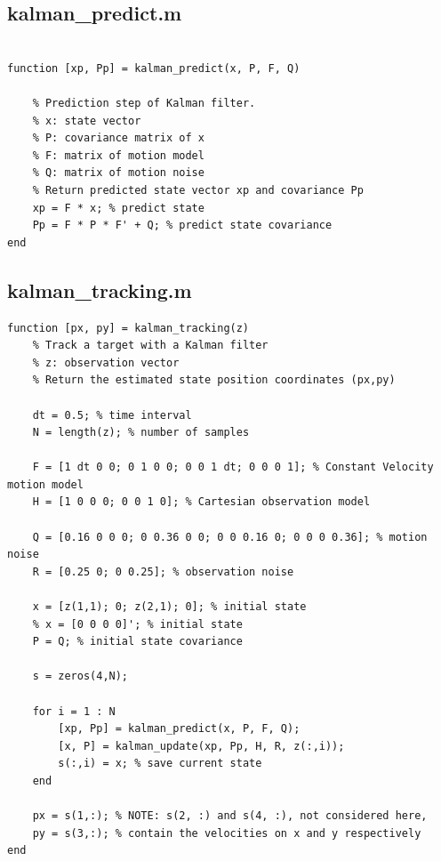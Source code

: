\documentclass[conference]{IEEEtran}
\begin{document}
        \subsection{kalman\_predict.m}
            \begin{lstlisting}[style=Matlab-editor, basicstyle=\scriptsize]
% https://uk.mathworks.com/help/control/ug/kalman-filtering.html 

function [xp, Pp] = kalman_predict(x, P, F, Q)

    % Prediction step of Kalman filter.
    % x: state vector
    % P: covariance matrix of x
    % F: matrix of motion model
    % Q: matrix of motion noise
    % Return predicted state vector xp and covariance Pp
    xp = F * x; % predict state
    Pp = F * P * F' + Q; % predict state covariance
end
            \end{lstlisting}
        \subsection{kalman\_tracking.m}
            \begin{lstlisting}[style=Matlab-editor, basicstyle=\scriptsize]
function [px, py] = kalman_tracking(z)
    % Track a target with a Kalman filter
    % z: observation vector
    % Return the estimated state position coordinates (px,py)

    dt = 0.5; % time interval
    N = length(z); % number of samples

    F = [1 dt 0 0; 0 1 0 0; 0 0 1 dt; 0 0 0 1]; % Constant Velocity motion model 
    H = [1 0 0 0; 0 0 1 0]; % Cartesian observation model
    
    Q = [0.16 0 0 0; 0 0.36 0 0; 0 0 0.16 0; 0 0 0 0.36]; % motion noise
    R = [0.25 0; 0 0.25]; % observation noise
    
    x = [z(1,1); 0; z(2,1); 0]; % initial state
    % x = [0 0 0 0]'; % initial state
    P = Q; % initial state covariance

    s = zeros(4,N);

    for i = 1 : N
        [xp, Pp] = kalman_predict(x, P, F, Q);
        [x, P] = kalman_update(xp, Pp, H, R, z(:,i));
        s(:,i) = x; % save current state
    end

    px = s(1,:); % NOTE: s(2, :) and s(4, :), not considered here,
    py = s(3,:); % contain the velocities on x and y respectively
end
            \end{lstlisting}
\end{document}
